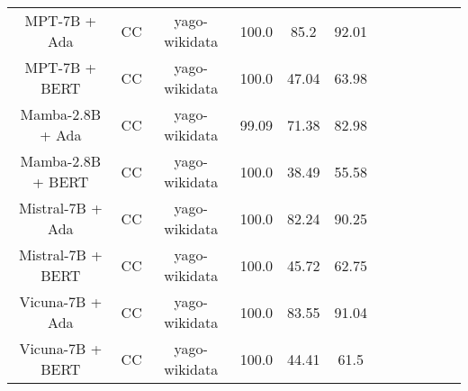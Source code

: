 \begin{table}
\begin{tabular}{|c|c|c|c|c|c|c|c|c|c|c|c|}
	MPT-7B + Ada  & CC & yago-wikidata  &  100.0 &  85.2 & 92.01  \\
	MPT-7B + BERT  & CC & yago-wikidata  &  100.0 &  47.04 & 63.98  \\
	Mamba-2.8B + Ada  & CC & yago-wikidata  &  99.09 &  71.38 & 82.98  \\
	Mamba-2.8B + BERT  & CC & yago-wikidata  &  100.0 &  38.49 & 55.58  \\
	Mistral-7B + Ada  & CC & yago-wikidata  &  100.0 &  82.24 & 90.25  \\
	Mistral-7B + BERT  & CC & yago-wikidata  &  100.0 &  45.72 & 62.75  \\
	Vicuna-7B + Ada  & CC & yago-wikidata  &  100.0 &  83.55 & 91.04  \\
	Vicuna-7B + BERT  & CC & yago-wikidata  &  100.0 &  44.41 & 61.5  \\
	\hline
\end{tabular}
    \end{table}








